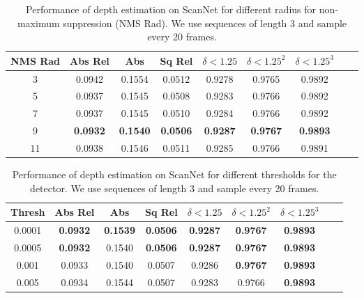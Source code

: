 \documentclass[runningheads]{llncs}
\begin{document}
\begin{table}[h]
  \caption{Performance of depth estimation on ScanNet for different radius for non-maximum suppression (NMS Rad). We use sequences of length 3 and sample every 20 frames. }
  \centering
\begin{tabular}{ccccccccc}
 \hline 
   NMS Rad  &Abs Rel  &Abs & Sq Rel & \textbf{$\delta< 1.25$}& \textbf{$\delta < 1.25^2$}& \textbf{$\delta< 1.25^3$}\\
    \hline
3 &	0.0942&	0.1554&	0.0512&	0.9278&	0.9765&	0.9892\\
5 & 0.0937&	0.1545&	0.0508&	0.9283&	0.9766&	0.9892\\
7 &0.0937&	0.1545&	0.0510&	0.9284&	0.9766&	0.9892\\
9 &	\textbf{0.0932} & \textbf{0.1540} & \textbf{0.0506} &  \textbf{0.9287} & \textbf{0.9767} & \textbf{0.9893} \\
11 &0.0938& 0.1546&	0.0511&	0.9285&	0.9766&	0.9891\\
\hline
  \end{tabular}
\label{tablenms}
\end{table}




\begin{table}[h]
  \caption{Performance of depth estimation on ScanNet for different thresholds for the detector. We use sequences of length 3 and sample every 20 frames. }
  \centering
\begin{tabular}{ccccccccc}
 \hline 
   Thresh  &Abs Rel  &Abs & Sq Rel & \textbf{$\delta< 1.25$}& \textbf{$\delta < 1.25^2$}& \textbf{$\delta< 1.25^3$}\\
    \hline
0.0001 & \textbf{0.0932} & \textbf{0.1539} & \textbf{0.0506} &  \textbf{0.9287} & \textbf{0.9767} & \textbf{0.9893} \\
0.0005 & \textbf{0.0932} & 0.1540 & \textbf{0.0506} &  \textbf{0.9287} & \textbf{0.9767} & \textbf{0.9893} \\
0.001 &0.0933&	0.1540&	0.0507&	0.9286&	\textbf{0.9767}&	\textbf{0.9893}\\
0.005 & 0.0934&	0.1544&	0.0507&	0.9283&	0.9766&	\textbf{0.9893}\\

\hline
  \end{tabular}
\label{tablethresh}
\end{table}
\end{document}
